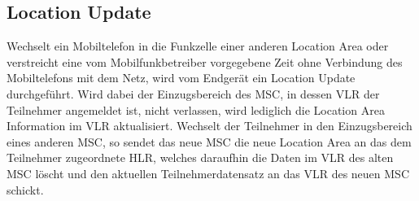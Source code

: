 \documentclass[loesung]{schulein}
\begin{document}
\subsection*{Location Update}

Wechselt ein Mobiltelefon in die Funkzelle einer anderen Location Area oder verstreicht eine vom Mobilfunkbetreiber vorgegebene Zeit ohne Verbindung des Mobiltelefons mit dem Netz, wird vom Endgerät ein Location Update durchgeführt. Wird dabei der Einzugsbereich des MSC, in dessen VLR der Teilnehmer angemeldet ist, nicht verlassen, wird lediglich die Location Area Information im VLR aktualisiert.
Wechselt der Teilnehmer in den Einzugsbereich eines anderen MSC, so sendet das neue MSC die neue Location Area an das dem Teilnehmer zugeordnete HLR, welches daraufhin die Daten im VLR des alten MSC löscht und den aktuellen Teilnehmerdatensatz an das VLR des neuen MSC schickt.
\end{document}
